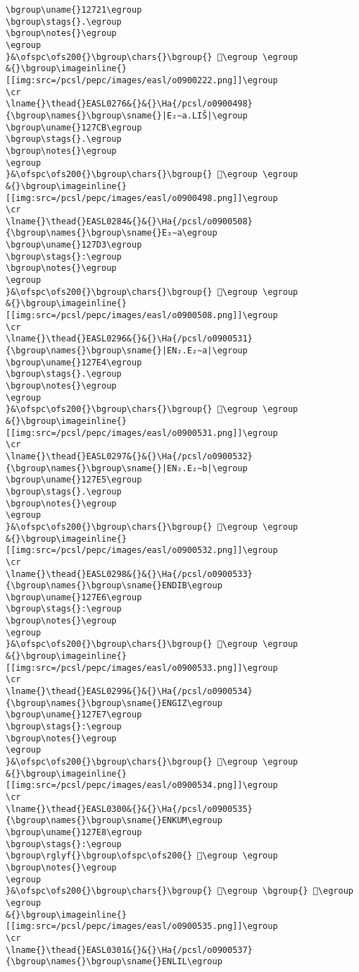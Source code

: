 \begin{verbatim}
\bgroup\uname{}12721\egroup
\bgroup\stags{}.\egroup
\bgroup\notes{}\egroup
\egroup
}&\ofspc\ofs200{}\bgroup\chars{}\bgroup{} 𒜡\egroup \egroup
&{}\bgroup\imageinline{}[[img:src=/pcsl/pepc/images/easl/o0900222.png]]\egroup
\cr
\lname{}\thead{}EASL0276&{}&{}\Ha{/pcsl/o0900498}{\bgroup\names{}\bgroup\sname{}|E₂∼a.LIŠ|\egroup
\bgroup\uname{}127CB\egroup
\bgroup\stags{}.\egroup
\bgroup\notes{}\egroup
\egroup
}&\ofspc\ofs200{}\bgroup\chars{}\bgroup{} 𒟋\egroup \egroup
&{}\bgroup\imageinline{}[[img:src=/pcsl/pepc/images/easl/o0900498.png]]\egroup
\cr
\lname{}\thead{}EASL0284&{}&{}\Ha{/pcsl/o0900508}{\bgroup\names{}\bgroup\sname{}E₃∼a\egroup
\bgroup\uname{}127D3\egroup
\bgroup\stags{}:\egroup
\bgroup\notes{}\egroup
\egroup
}&\ofspc\ofs200{}\bgroup\chars{}\bgroup{} 𒟓\egroup \egroup
&{}\bgroup\imageinline{}[[img:src=/pcsl/pepc/images/easl/o0900508.png]]\egroup
\cr
\lname{}\thead{}EASL0296&{}&{}\Ha{/pcsl/o0900531}{\bgroup\names{}\bgroup\sname{}|EN₂.E₂∼a|\egroup
\bgroup\uname{}127E4\egroup
\bgroup\stags{}.\egroup
\bgroup\notes{}\egroup
\egroup
}&\ofspc\ofs200{}\bgroup\chars{}\bgroup{} 𒟤\egroup \egroup
&{}\bgroup\imageinline{}[[img:src=/pcsl/pepc/images/easl/o0900531.png]]\egroup
\cr
\lname{}\thead{}EASL0297&{}&{}\Ha{/pcsl/o0900532}{\bgroup\names{}\bgroup\sname{}|EN₂.E₂∼b|\egroup
\bgroup\uname{}127E5\egroup
\bgroup\stags{}.\egroup
\bgroup\notes{}\egroup
\egroup
}&\ofspc\ofs200{}\bgroup\chars{}\bgroup{} 𒟥\egroup \egroup
&{}\bgroup\imageinline{}[[img:src=/pcsl/pepc/images/easl/o0900532.png]]\egroup
\cr
\lname{}\thead{}EASL0298&{}&{}\Ha{/pcsl/o0900533}{\bgroup\names{}\bgroup\sname{}ENDIB\egroup
\bgroup\uname{}127E6\egroup
\bgroup\stags{}:\egroup
\bgroup\notes{}\egroup
\egroup
}&\ofspc\ofs200{}\bgroup\chars{}\bgroup{} 𒟦\egroup \egroup
&{}\bgroup\imageinline{}[[img:src=/pcsl/pepc/images/easl/o0900533.png]]\egroup
\cr
\lname{}\thead{}EASL0299&{}&{}\Ha{/pcsl/o0900534}{\bgroup\names{}\bgroup\sname{}ENGIZ\egroup
\bgroup\uname{}127E7\egroup
\bgroup\stags{}:\egroup
\bgroup\notes{}\egroup
\egroup
}&\ofspc\ofs200{}\bgroup\chars{}\bgroup{} 𒟧\egroup \egroup
&{}\bgroup\imageinline{}[[img:src=/pcsl/pepc/images/easl/o0900534.png]]\egroup
\cr
\lname{}\thead{}EASL0300&{}&{}\Ha{/pcsl/o0900535}{\bgroup\names{}\bgroup\sname{}ENKUM\egroup
\bgroup\uname{}127E8\egroup
\bgroup\stags{}:\egroup
\bgroup\rglyf{}\bgroup\ofspc\ofs200{} 𒟨\egroup \egroup
\bgroup\notes{}\egroup
\egroup
}&\ofspc\ofs200{}\bgroup\chars{}\bgroup{} 𒟨\egroup \bgroup{} 𒟩\egroup \egroup
&{}\bgroup\imageinline{}[[img:src=/pcsl/pepc/images/easl/o0900535.png]]\egroup
\cr
\lname{}\thead{}EASL0301&{}&{}\Ha{/pcsl/o0900537}{\bgroup\names{}\bgroup\sname{}ENLIL\egroup

\end{verbatim}
